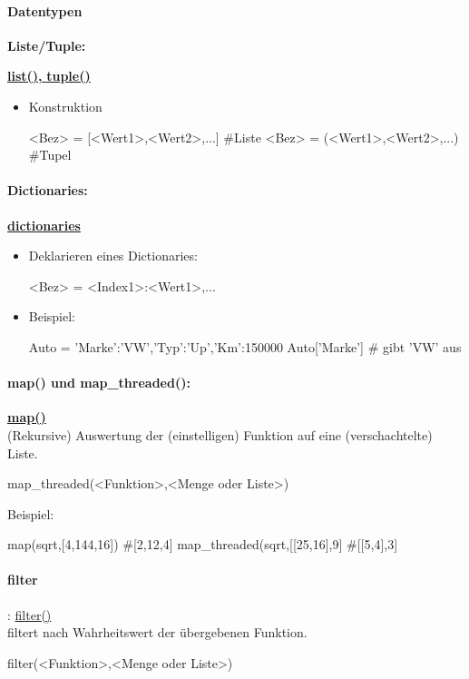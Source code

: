 \documentclass[a4paper,9pt,DIV15,twocolumn]{scrartcl}
\begin{document}
\paragraph{Datentypen}
\textbf{Liste/Tuple:} 	{\href{http://docs.python.org/library/functions.html#list}{\textbf{list(),} } \href{http://docs.python.org/library/functions.html#tuple}{\textbf{tuple()}}
\begin{itemize}
 \item Konstruktion
\begin{sageinsmall}
<Bez> = [<Wert1>,<Wert2>,...] #Liste
<Bez> = (<Wert1>,<Wert2>,...) #Tupel
\end{sageinsmall}
\end{itemize}
\paragraph{Dictionaries:}		\href{http://docs.python.org/library/stdtypes.html?highlight=.update#mapping-types-dict}{\textbf{dictionaries}}
\begin{itemize}
 \item Deklarieren eines Dictionaries:
\begin{sageinsmall}[belowskip=0em,aboveskip=0em]
<Bez> = {<Index1>:<Wert1>,...}
\end{sageinsmall}
 \item Beispiel:
\begin{sageinsmall}
Auto = {'Marke':'VW','Typ':'Up','Km':150000}
Auto['Marke']		# gibt 'VW' aus
\end{sageinsmall}
\end{itemize}

\paragraph{map() und map\_threaded():} \href{https://sage.math.uni-goettingen.de/doc/static/reference/sage/combinat/generator.html?highlight=map#sage.combinat.generator.map}{\textbf{map()}\\}
(Rekursive) Auswertung der (einstelligen) Funktion auf eine (verschachtelte) Liste.
\begin{sageinsmall}
 map_threaded(<Funktion>,<Menge oder Liste>)
\end{sageinsmall}
Beispiel:
\begin{sageinsmall}
 map(sqrt,[4,144,16]) 			#[2,12,4]
 map_threaded(sqrt,[[25,16],9]	#[[5,4],3]
\end{sageinsmall}

\paragraph{filter}: \href{https://sage.math.uni-goettingen.de/doc/static/reference/sage/combinat/combinat.html?highlight=filter#sage.combinat.combinat.CombinatorialClass.filter}{filter()}\\ filtert nach Wahrheitswert der übergebenen Funktion. 
\begin{sageinsmall}
filter(<Funktion>,<Menge oder Liste>)
\end{sageinsmall}

}
\end{document}
